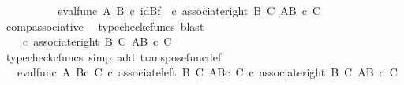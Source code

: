 \begin{isabellebody}
\ \ \ \ \ \ \isamarkupfalse%
\ \isamarkupfalse%
\ {\isachardoublequoteopen}{\isachardot}{\kern0pt}{\isachardot}{\kern0pt}{\isachardot}{\kern0pt}\ {\isacharequal}{\kern0pt}{\isacharparenleft}{\kern0pt}{\isacharparenleft}{\kern0pt}eval{\isacharunderscore}{\kern0pt}func\ A\ B{\isacharparenright}{\kern0pt}\ {\isasymcirc}\isactrlsub c\ {\isacharparenleft}{\kern0pt}id{\isacharparenleft}{\kern0pt}B{\isacharparenright}{\kern0pt}{\isasymtimes}\isactrlsub f\ {\isasymphi}\isactrlsup {\isasymsharp}{\isacharparenright}{\kern0pt}{\isacharparenright}{\kern0pt}\ {\isasymcirc}\isactrlsub c\ {\isacharparenleft}{\kern0pt}associate{\isacharunderscore}{\kern0pt}right\ B\ C\ {\isacharparenleft}{\kern0pt}A\isactrlbsup {\isacharparenleft}{\kern0pt}B\ {\isasymtimes}\isactrlsub c\ C{\isacharparenright}{\kern0pt}\isactrlesup {\isacharparenright}{\kern0pt}{\isacharparenright}{\kern0pt}{\isachardoublequoteclose}\isanewline
\ \ \ \ \ \ \ \ \isamarkupfalse%
\ comp{\isacharunderscore}{\kern0pt}associative{}\ \isamarkupfalse%
\ {\isacharparenleft}{\kern0pt}typecheck{\isacharunderscore}{\kern0pt}cfuncs{\isacharcomma}{\kern0pt}\ blast{\isacharparenright}{\kern0pt}\isanewline
\ \ \ \ \ \ \isamarkupfalse%
\ \isamarkupfalse%
\ {\isachardoublequoteopen}{\isachardot}{\kern0pt}{\isachardot}{\kern0pt}{\isachardot}{\kern0pt}\ {\isacharequal}{\kern0pt}\ {\isasymphi}\ {\isasymcirc}\isactrlsub c\ {\isacharparenleft}{\kern0pt}associate{\isacharunderscore}{\kern0pt}right\ B\ C\ {\isacharparenleft}{\kern0pt}A\isactrlbsup {\isacharparenleft}{\kern0pt}B\ {\isasymtimes}\isactrlsub c\ C{\isacharparenright}{\kern0pt}\isactrlesup {\isacharparenright}{\kern0pt}{\isacharparenright}{\kern0pt}{\isachardoublequoteclose}\isanewline
\ \ \ \ \ \ \ \ \isamarkupfalse%
\ {\isacharparenleft}{\kern0pt}typecheck{\isacharunderscore}{\kern0pt}cfuncs{\isacharcomma}{\kern0pt}\ simp\ add{\isacharcolon}{\kern0pt}\ transpose{\isacharunderscore}{\kern0pt}func{\isacharunderscore}{\kern0pt}def{\isacharparenright}{\kern0pt}\isanewline
\ \ \ \ \ \ \isamarkupfalse%
\ \isamarkupfalse%
\ {\isachardoublequoteopen}{\isachardot}{\kern0pt}{\isachardot}{\kern0pt}{\isachardot}{\kern0pt}\ {\isacharequal}{\kern0pt}\ {\isacharparenleft}{\kern0pt}eval{\isacharunderscore}{\kern0pt}func\ A\ {\isacharparenleft}{\kern0pt}B{\isasymtimes}\isactrlsub c\ C{\isacharparenright}{\kern0pt}{\isacharparenright}{\kern0pt}\ {\isasymcirc}\isactrlsub c\ {\isacharparenleft}{\kern0pt}{\isacharparenleft}{\kern0pt}associate{\isacharunderscore}{\kern0pt}left\ B\ C\ {\isacharparenleft}{\kern0pt}A\isactrlbsup {\isacharparenleft}{\kern0pt}B{\isasymtimes}\isactrlsub c\ C{\isacharparenright}{\kern0pt}\isactrlesup {\isacharparenright}{\kern0pt}{\isacharparenright}{\kern0pt}\ {\isasymcirc}\isactrlsub c\ {\isacharparenleft}{\kern0pt}associate{\isacharunderscore}{\kern0pt}right\ B\ C\ {\isacharparenleft}{\kern0pt}A\isactrlbsup {\isacharparenleft}{\kern0pt}B\ {\isasymtimes}\isactrlsub c\ C{\isacharparenright}{\kern0pt}\isactrlesup {\isacharparenright}{\kern0pt}{\isacharparenright}{\kern0pt}{\isacharparenright}{\kern0pt}{\isachardoublequoteclose}\isanewline

\end{isabellebody}

